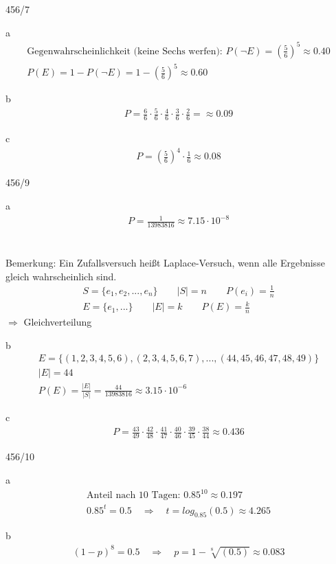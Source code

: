\begin{exercise}{456/7}
  \item [a]
  \begin{gather*}
    \text{Gegenwahrscheinlichkeit (keine Sechs werfen): } P(\neg E) = (\frac{5}{6})^5 \approx 0.40 \\
    P(E) = 1 - P(\neg E) = 1 - (\frac{5}{6})^5 \approx 0.60
  \end{gather*}
  \item [b]
  \begin{gather*}
    P = \frac{6}{6} \cdot \frac{5}{6} \cdot \frac{4}{6} \cdot \frac{3}{6} \cdot \frac{2}{6} = \approx 0.09
  \end{gather*}
  \item [c]
  \begin{gather*}
    P = (\frac{5}{6})^4 \cdot \frac{1}{6} \approx 0.08
  \end{gather*}
\end{exercise}
\begin{exercise}{456/9}
  \item [a]
  \begin{gather*}
    P = \frac{1}{13983816} \approx 7.15 \cdot 10^{-8}
  \end{gather*} \\\\
  Bemerkung: Ein Zufallsversuch heißt Laplace-Versuch, wenn alle Ergebnisse gleich wahrscheinlich sind.
  \begin{gather*}
    S = \{e_1, e_2, ..., e_n\} \qquad |S| = n \qquad P(e_i) = \frac{1}{n} \\
    E = \{e_1, ...\} \qquad |E| = k \qquad P(E) = \frac{k}{n}
  \end{gather*}
  $\Rightarrow$ Gleichverteilung
  \item [b]
  \begin{gather*}
    E = \{(1,2,3,4,5,6), (2,3,4,5,6,7), ..., (44,45,46,47,48,49)\} \\
    |E| = 44 \\
    P(E) = \frac{|E|}{|S|} = \frac{44}{13983816} \approx 3.15 \cdot 10^{-6}
  \end{gather*}
  \item [c]
  \begin{gather*}
    P = \frac{43}{49} \cdot \frac{42}{48} \cdot \frac{41}{47} \cdot \frac{40}{46} \cdot \frac{39}{45} \cdot \frac{38}{44} \approx 0.436
  \end{gather*}
\end{exercise}
\begin{exercise}{456/10}
  \item [a]
  \begin{gather*}
    \text{Anteil nach $10$ Tagen: } 0.85^{10} \approx 0.197 \\
    0.85^t = 0.5 \quad\Rightarrow\quad t = log_{0.85}(0.5) \approx 4.265
  \end{gather*}
  \item [b]
  \begin{gather*}
    (1 - p)^8 = 0.5 \quad\Rightarrow\quad p = 1 - \sqrt[8]{(0.5)} \approx 0.083
  \end{gather*}
\end{exercise}
